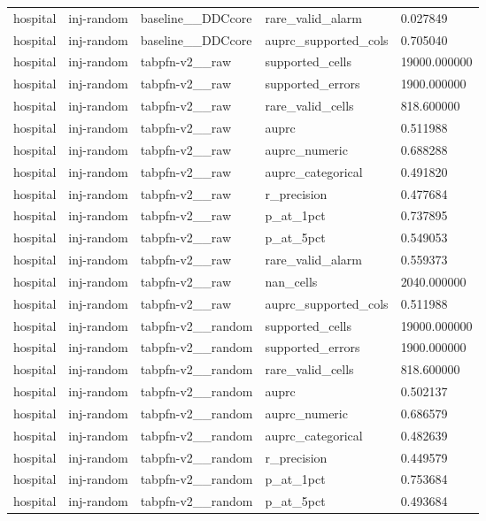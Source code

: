 \begin{tabular}{lllll}
hospital & inj-random & baseline\_\_DDCcore & rare\_valid\_alarm & 0.027849 \\
hospital & inj-random & baseline\_\_DDCcore & auprc\_supported\_cols & 0.705040 \\
hospital & inj-random & tabpfn-v2\_\_raw & supported\_cells & 19000.000000 \\
hospital & inj-random & tabpfn-v2\_\_raw & supported\_errors & 1900.000000 \\
hospital & inj-random & tabpfn-v2\_\_raw & rare\_valid\_cells & 818.600000 \\
hospital & inj-random & tabpfn-v2\_\_raw & auprc & 0.511988 \\
hospital & inj-random & tabpfn-v2\_\_raw & auprc\_numeric & 0.688288 \\
hospital & inj-random & tabpfn-v2\_\_raw & auprc\_categorical & 0.491820 \\
hospital & inj-random & tabpfn-v2\_\_raw & r\_precision & 0.477684 \\
hospital & inj-random & tabpfn-v2\_\_raw & p\_at\_1pct & 0.737895 \\
hospital & inj-random & tabpfn-v2\_\_raw & p\_at\_5pct & 0.549053 \\
hospital & inj-random & tabpfn-v2\_\_raw & rare\_valid\_alarm & 0.559373 \\
hospital & inj-random & tabpfn-v2\_\_raw & nan\_cells & 2040.000000 \\
hospital & inj-random & tabpfn-v2\_\_raw & auprc\_supported\_cols & 0.511988 \\
hospital & inj-random & tabpfn-v2\_\_random & supported\_cells & 19000.000000 \\
hospital & inj-random & tabpfn-v2\_\_random & supported\_errors & 1900.000000 \\
hospital & inj-random & tabpfn-v2\_\_random & rare\_valid\_cells & 818.600000 \\
hospital & inj-random & tabpfn-v2\_\_random & auprc & 0.502137 \\
hospital & inj-random & tabpfn-v2\_\_random & auprc\_numeric & 0.686579 \\
hospital & inj-random & tabpfn-v2\_\_random & auprc\_categorical & 0.482639 \\
hospital & inj-random & tabpfn-v2\_\_random & r\_precision & 0.449579 \\
hospital & inj-random & tabpfn-v2\_\_random & p\_at\_1pct & 0.753684 \\
hospital & inj-random & tabpfn-v2\_\_random & p\_at\_5pct & 0.493684 \\

\end{tabular}
